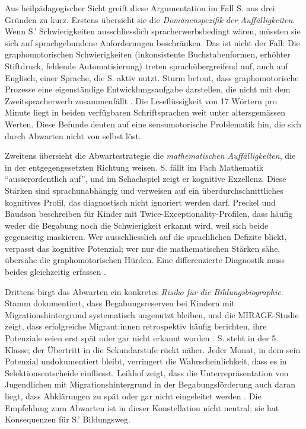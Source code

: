 \documentclass[ngerman, a4paper]{article}
\begin{document}
Aus heilpädagogischer Sicht greift diese Argumentation im Fall S. aus drei
Gründen zu kurz. Erstens übersieht sie die \textit{Domänenspezifik der
Auffälligkeiten}. Wenn S.' Schwierigkeiten ausschliesslich spracherwerbsbedingt
wären, müssten sie sich auf sprachgebundene Anforderungen beschränken. Das
ist nicht der Fall: Die graphomotorischen Schwierigkeiten (inkonsistente
Buchstabenformen, erhöhter Stiftdruck, fehlende Automatisierung) treten
sprachübergreifend auf, auch auf Englisch, einer Sprache, die S. aktiv nutzt.
Sturm betont, dass graphomotorische Prozesse eine eigenständige
Entwicklungsaufgabe darstellen, die nicht mit dem Zweitspracherwerb
zusammenfällt \parencite{sturm2016graphomotorik}. Die Leseflüssigkeit von 17
Wörtern pro Minute liegt in beiden verfügbaren Schriftsprachen weit unter
altersgemässen Werten. Diese Befunde deuten auf eine sensumotorische
Problematik hin, die sich durch Abwarten nicht von selbst löst.

Zweitens übersieht die Abwartestrategie die \textit{mathematischen
Auffälligkeiten}, die in der entgegengesetzten Richtung weisen. S. fällt
im Fach Mathematik \enquote{ausserordentlich auf}, und im Schachspiel zeigt
er kognitive Exzellenz. Diese Stärken sind sprachunabhängig und verweisen
auf ein überdurchschnittliches kognitives Profil, das diagnostisch nicht
ignoriert werden darf. Preckel und Baudson beschreiben für Kinder mit
Twice-Exceptionality-Profilen, dass häufig weder die Begabung noch die
Schwierigkeit erkannt wird, weil sich beide gegenseitig maskieren. Wer
ausschliesslich auf die sprachlichen Defizite blickt, verpasst das
kognitive Potenzial; wer nur die mathematischen Stärken sähe, übersähe
die graphomotorischen Hürden. Eine differenzierte Diagnostik muss beides
gleichzeitig erfassen \parencite{preckel2013hochbegabung}.

Drittens birgt das Abwarten ein konkretes \textit{Risiko für die
Bildungsbiographie}. Stamm dokumentiert, dass Begabungsreserven bei Kindern
mit Migrationshintergrund systematisch ungenutzt bleiben, und die
MIRAGE-Studie zeigt, dass erfolgreiche Migrant:innen retrospektiv häufig
berichten, ihre Potenziale seien erst spät oder gar nicht erkannt worden
\parencite{stamm2014mirage}. S. steht in der 5. Klasse; der Übertritt in
die Sekundarstufe rückt näher. Jeder Monat, in dem sein Potenzial
undokumentiert bleibt, verringert die Wahrscheinlichkeit, dass es in
Selektionsentscheide einfliesst. Leikhof zeigt, dass die Unterrepräsentation
von Jugendlichen mit Migrationshintergrund in der Begabungsförderung auch
daran liegt, dass Abklärungen zu spät oder gar nicht eingeleitet werden
\parencite{leikhof2021jugendliche}. Die Empfehlung zum Abwarten ist in
dieser Konstellation nicht neutral; sie hat Konsequenzen für S.' Bildungsweg.
\end{document}
